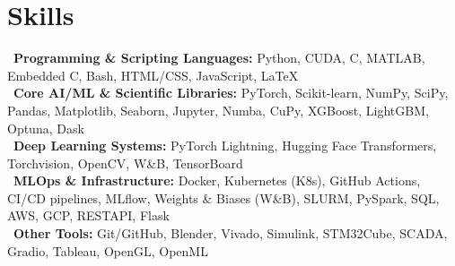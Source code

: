 \section*{Skills}
\textbullet~\textbf{Programming \& Scripting Languages:} Python, CUDA, C, MATLAB, Embedded C, Bash, HTML/CSS, JavaScript, \LaTeX \\
\textbullet~\textbf{Core AI/ML \& Scientific Libraries:} PyTorch, Scikit-learn, NumPy, SciPy, Pandas, Matplotlib, Seaborn, Jupyter, Numba, CuPy, XGBoost, LightGBM, Optuna, Dask \\
\textbullet~\textbf{Deep Learning Systems:} PyTorch Lightning, Hugging Face Transformers, Torchvision, OpenCV, W\&B, TensorBoard \\
\textbullet~\textbf{MLOps \& Infrastructure:} Docker, Kubernetes (K8s), GitHub Actions, CI/CD pipelines, MLflow, Weights \& Biases (W\&B), SLURM, PySpark, SQL, AWS, GCP, RESTAPI, Flask \\
\textbullet~\textbf{Other Tools:} Git/GitHub, Blender, Vivado, Simulink, STM32Cube, SCADA, Gradio, Tableau, OpenGL, OpenML